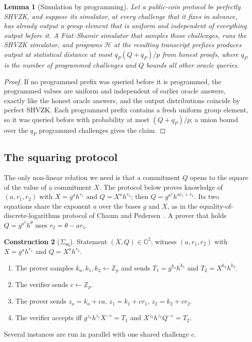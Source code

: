 \documentclass[11pt]{article}
\newtheorem{lemma}{Lemma}[section]
\theoremstyle{definition}
\newtheorem{construction}[lemma]{Construction}
\theoremstyle{remark}
\newcommand{\Z}{\mathbb{Z}}
\newcommand{\G}{\mathbb{G}}
\newcommand{\RO}{\mathcal{H}}
\newcommand{\Sq}{\Sigma_{\mathrm{sq}}}
\begin{document}
\begin{lemma}[Simulation by programming]\label{lem:fszk}
Let a public-coin protocol be perfectly SHVZK, and suppose its simulator, at every challenge that it fixes in advance, has already output a group element that is uniform and independent of everything output before it. A Fiat--Shamir simulator that samples those challenges, runs the SHVZK simulator, and programs $\RO$ at the resulting transcript prefixes produces output at statistical distance at most $q_P(Q+q_P)/p$ from honest proofs, where $q_P$ is the number of programmed challenges and $Q$ bounds all other oracle queries.
\end{lemma}
\begin{proof}
If no programmed prefix was queried before it is programmed, the programmed values are uniform and independent of earlier oracle answers, exactly like the honest oracle answers, and the output distributions coincide by perfect SHVZK. Each programmed prefix contains a fresh uniform group element, so it was queried before with probability at most $(Q+q_P)/p$; a union bound over the $q_P$ programmed challenges gives the claim.
\end{proof}

\subsection{The squaring protocol}\label{sec:square}
The only non-linear relation we need is that a commitment $Q$ opens to the square of the value of a commitment $X$. The protocol below proves knowledge of $(a,r_1,r_2)$ with $X=g^ah^{r_1}$ and $Q=X^ah^{r_2}$; then $Q=g^{a^2}h^{ar_1+r_2}$. Its two equations share the exponent $a$ over the bases $g$ and $X$, as in the equality-of-discrete-logarithms protocol of Chaum and Pedersen~\cite{chaum-pedersen}. A prover that holds $Q=g^{a^2}h^\theta$ uses $r_2=\theta-ar_1$.

\begin{construction}[$\Sq$]\label{con:square}
Statement $(X,Q)\in\G^2$; witness $(a,r_1,r_2)$ with $X=g^ah^{r_1}$ and $Q=X^ah^{r_2}$.
\begin{enumerate}[label=\arabic*.]
  \item The prover samples $k_a,k_1,k_2\gets\Z_p$ and sends $T_1=g^{k_a}h^{k_1}$ and $T_2=X^{k_a}h^{k_2}$.
  \item The verifier sends $c\gets\Z_p$.
  \item The prover sends $z_a=k_a+ca$, $z_1=k_1+cr_1$, $z_2=k_2+cr_2$.
  \item The verifier accepts iff $g^{z_a}h^{z_1}X^{-c}=T_1$ and $X^{z_a}h^{z_2}Q^{-c}=T_2$.
\end{enumerate}
Several instances are run in parallel with one shared challenge $c$.
\end{construction}
\end{document}
